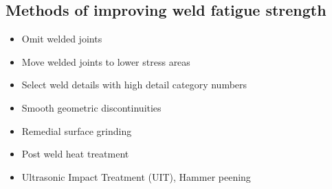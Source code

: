 \documentclass[11pt, a4paper]{article}
\begin{document}
\subsection{Methods of improving weld fatigue strength}
\begin{itemize}
	\item Omit welded joints
	\item Move welded joints to lower stress areas
	\item Select weld details with high detail category numbers
	\item Smooth geometric discontinuities
	\item Remedial surface grinding
	\item Post weld heat treatment
	\item Ultrasonic Impact Treatment (UIT), Hammer peening
\end{itemize}
\end{document}

